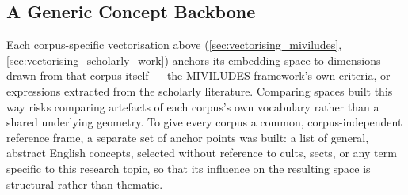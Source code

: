 \subsection{A Generic Concept Backbone}\label{sec:concept_backbone}
Each corpus-specific vectorisation above (\ref{sec:vectorising_miviludes}, \ref{sec:vectorising_scholarly_work}) anchors its embedding space to dimensions drawn from that corpus itself — the MIVILUDES framework's own criteria, or expressions extracted from the scholarly literature. Comparing spaces built this way risks comparing artefacts of each corpus's own vocabulary rather than a shared underlying geometry. To give every corpus a common, corpus-independent reference frame, a separate set of anchor points was built: a list of general, abstract English concepts, selected without reference to cults, sects, or any term specific to this research topic, so that its influence on the resulting space is structural rather than thematic.

